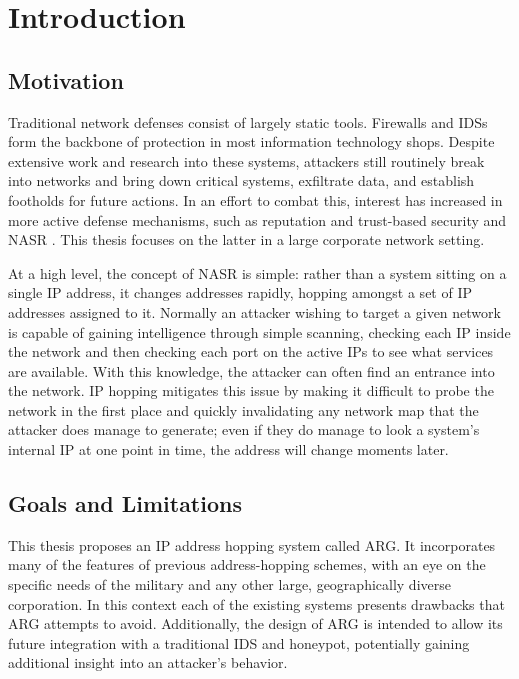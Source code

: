 \chapter{Introduction}
\label{chp:introduction}

\section{Motivation}
\par Traditional network defenses consist of largely static tools. Firewalls and \acp{IDS} form the backbone of protection in most information technology shops. Despite extensive work and research into these systems, attackers still routinely break into networks and bring down critical systems, exfiltrate data, and establish footholds for future actions. In an effort to combat this, interest has increased in more active defense mechanisms, such as reputation and trust-based security \cite{Untrustworthiness} and \ac{NASR} \cite{APOD, NAH}. This thesis focuses on the latter in a large corporate network setting.

\par At a high level, the concept of \ac{NASR} is simple: rather than a system sitting on a single \ac{IP} address, it changes addresses rapidly, hopping amongst a set of \ac{IP} addresses assigned to it. Normally an attacker wishing to target a given network is capable of gaining intelligence through simple scanning, checking each \ac{IP} inside the network and then checking each port on the active \acp{IP} to see what services are available. With this knowledge, the attacker can often find an entrance into the network. \ac{IP} hopping mitigates this issue by making it difficult to probe the network in the first place and quickly invalidating any network map that the attacker does manage to generate; even if they do manage to look a system's internal \ac{IP} at one point in time, the address will change moments later.

\section{Goals and Limitations}
\par This thesis proposes an \ac{IP} address hopping system called \ac{ARG}. It incorporates many of the features of previous address-hopping schemes, with an eye on the specific needs of the military and any other large, geographically diverse corporation. In this context each of the existing systems presents drawbacks that \ac{ARG} attempts to avoid. Additionally, the design of ARG is intended to allow its future integration with a traditional \ac{IDS} and honeypot, potentially gaining additional insight into an attacker's behavior.

